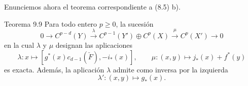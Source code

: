 Enunciemos ahora el teorema correspondiente a (8.5) b).

\begin{statement}{Teorema 9.9}
Para todo entero $p\ge0$, la sucesión
\[
0\to C^{p-d}(Y)\xrightarrow{\lambda} C^{p-1}(Y')\oplus C^p(X)\xrightarrow{\mu} C^p(X')\to0
\]
en la cual $\lambda$ y $\mu$ designan las aplicaciones
\[
\lambda:x\mapsto[g^*(x)c_{d-1}(\check F),-i_*(x)],
\qquad
\mu:(x,y)\mapsto j_*(x)+f^*(y)
\]
es exacta. Además, la aplicación $\lambda$ admite como inversa por la izquierda
\[
\lambda':(x,y)\mapsto g_*(x).
\]
\end{statement}
